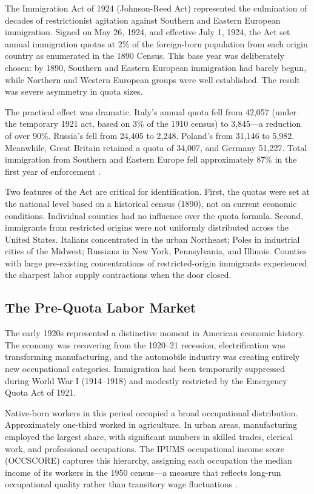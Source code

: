 \documentclass[12pt]{article}
\begin{document}
The Immigration Act of 1924 (Johnson-Reed Act) represented the culmination of decades of restrictionist agitation against Southern and Eastern European immigration.  Signed on May 26, 1924, and effective July 1, 1924, the Act set annual immigration quotas at 2\% of the foreign-born population from each origin country as enumerated in the 1890 Census.  This base year was deliberately chosen: by 1890, Southern and Eastern European immigration had barely begun, while Northern and Western European groups were well established.  The result was severe asymmetry in quota sizes.

The practical effect was dramatic.  Italy's annual quota fell from 42,057 (under the temporary 1921 act, based on 3\% of the 1910 census) to 3,845---a reduction of over 90\%.  Russia's fell from 24,405 to 2,248.  Poland's from 31,146 to 5,982.  Meanwhile, Great Britain retained a quota of 34,007, and Germany 51,227.  Total immigration from Southern and Eastern Europe fell approximately 87\% in the first year of enforcement \citep{goldin1994political, daniels2004guarding}.

Two features of the Act are critical for identification.  First, the quotas were set at the national level based on a historical census (1890), not on current economic conditions.  Individual counties had no influence over the quota formula.  Second, immigrants from restricted origins were not uniformly distributed across the United States.  Italians concentrated in the urban Northeast; Poles in industrial cities of the Midwest; Russians in New York, Pennsylvania, and Illinois.  Counties with large pre-existing concentrations of restricted-origin immigrants experienced the sharpest labor supply contractions when the door closed.

\subsection{The Pre-Quota Labor Market}

The early 1920s represented a distinctive moment in American economic history.  The economy was recovering from the 1920--21 recession, electrification was transforming manufacturing, and the automobile industry was creating entirely new occupational categories.  Immigration had been temporarily suppressed during World War I (1914--1918) and modestly restricted by the Emergency Quota Act of 1921.

Native-born workers in this period occupied a broad occupational distribution.  Approximately one-third worked in agriculture.  In urban areas, manufacturing employed the largest share, with significant numbers in skilled trades, clerical work, and professional occupations.  The IPUMS occupational income score (OCCSCORE) captures this hierarchy, assigning each occupation the median income of its workers in the 1950 census---a measure that reflects long-run occupational quality rather than transitory wage fluctuations \citep{ruggles2024ipums}.
\end{document}
